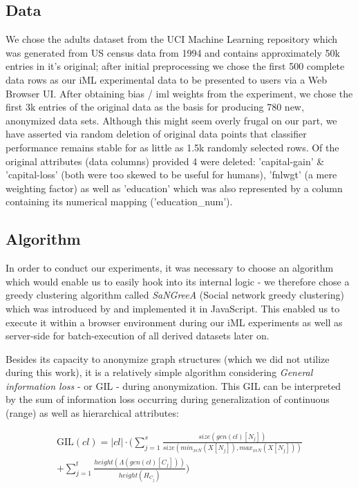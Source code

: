\documentclass{llncs}
\providecommand{\abs}[1]{\lvert#1\rvert}
\begin{document}
\subsection{Data} 
\label{ssect:data}

We chose the adults dataset from the UCI Machine Learning repository which was generated from US census data from 1994 and contains approximately 50k entries in it's original; after initial preprocessing we chose the first 500 complete data rows as our iML experimental data to be presented to users via a Web Browser UI. After obtaining bias / iml weights from the experiment, we chose the first 3k entries of the original data as the basis for producing 780 new, anonymized data sets. Although this might seem overly frugal on our part, we have asserted via random deletion of original data points that classifier performance remains stable for as little as 1.5k randomly selected rows. 
Of the original attributes (data columns) provided 4 were deleted: 'capital-gain' \& 'capital-loss' (both were too skewed to be useful for humans), 'fnlwgt' (a mere weighting factor) as well as 'education' which was also represented by a column containing its numerical mapping ('education\_num').


\subsection{Algorithm}
\label{ssect:algorithm}

In order to conduct our experiments, it was necessary to choose an algorithm which would enable us to easily hook into its internal logic - we therefore chose a greedy clustering algorithm called \textit{SaNGreeA} (Social network greedy clustering) which was introduced by \cite{campan2009data} and implemented it in JavaScript. This enabled us to execute it within a browser environment during our iML experiments as well as server-side for batch-execution of all derived datasets later on.

Besides its capacity to anonymize graph structures (which we did not utilize during this work), it is a relatively simple algorithm considering \textit{General information loss} - or GIL - during anonymization. This GIL can be interpreted by the sum of information loss occurring during generalization of continuous (range) as well as hierarchical attributes:

\begin{equation*}
\begin{split}
\text{GIL}(cl) = \abs{cl} \cdot (\sum_{j=1}^{s} \frac{size(gen(cl)[N_j])}{size(min_{x \epsilon N} (X[N_j]), max_{x \epsilon N} (X[N_j]))} \\
+ \sum_{j=1}^{t} \frac{height(\Lambda(gen(cl)[C_j]))}{height(H_{C_j})})
\end{split}
\end{equation*}
\end{document}
